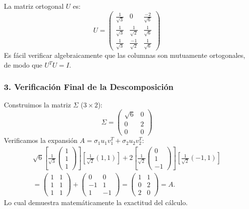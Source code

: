 \documentclass[12pt]{article}
\begin{document}
La matriz ortogonal $U$ es:
\begin{equation}
    U = \begin{pmatrix} \frac{1}{\sqrt{3}} & 0 & \frac{-2}{\sqrt{6}} \\ \frac{1}{\sqrt{3}} & \frac{1}{\sqrt{2}} & \frac{1}{\sqrt{6}} \\ \frac{1}{\sqrt{3}} & \frac{-1}{\sqrt{2}} & \frac{1}{\sqrt{6}} \end{pmatrix}
\end{equation}
Es fácil verificar algebraicamente que las columnas son mutuamente ortogonales, de modo que $U^T U = I$.

\subsubsection*{3. Verificación Final de la Descomposición}
Construimos la matriz $\Sigma$ ($3 \times 2$):
\begin{equation}
    \Sigma = \begin{pmatrix} \sqrt{6} & 0 \\ 0 & 2 \\ 0 & 0 \end{pmatrix}
\end{equation}
Verificamos la expansión $A = \sigma_1 u_1 v_1^T + \sigma_2 u_2 v_2^T$:
\begin{align*}
    \sqrt{6} \left[ \frac{1}{\sqrt{3}} \begin{pmatrix} 1 \\ 1 \\ 1 \end{pmatrix} \right] \left[ \frac{1}{\sqrt{2}} (1, 1) \right] + 2 \left[ \frac{1}{\sqrt{2}} \begin{pmatrix} 0 \\ 1 \\ -1 \end{pmatrix} \right] \left[ \frac{1}{\sqrt{2}} (-1, 1) \right] \\
    = \begin{pmatrix} 1 & 1 \\ 1 & 1 \\ 1 & 1 \end{pmatrix} + \begin{pmatrix} 0 & 0 \\ -1 & 1 \\ 1 & -1 \end{pmatrix} = \begin{pmatrix} 1 & 1 \\ 0 & 2 \\ 2 & 0 \end{pmatrix} = A.
\end{align*}
Lo cual demuestra matemáticamente la exactitud del cálculo.
\end{document}
